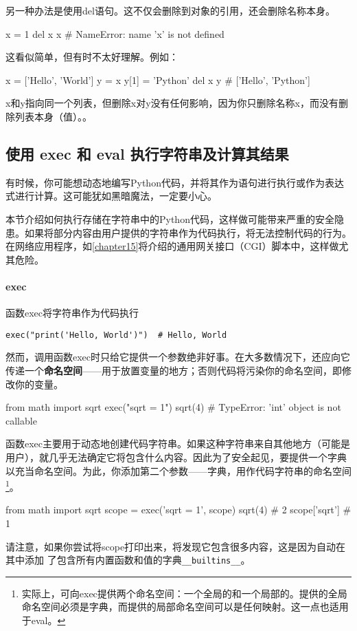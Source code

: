 另一种办法是使用del语句。这不仅会删除到对象的引用，还会删除名称本身。
\begin{pyc}
x = 1
del x
x  # NameError: name 'x' is not defined
\end{pyc}
这看似简单，但有时不太好理解。例如：
\begin{pyc}
x = ['Hello', 'World']
y = x
y[1] = 'Python'
del x
y  # ['Hello', 'Python']
\end{pyc}
x和y指向同一个列表，但删除x对y没有任何影响，因为你只删除名称x，而没有删除列表本身（值）。。
\subsection{使用 exec 和 eval 执行字符串及计算其结果}
有时候，你可能想动态地编写Python代码，并将其作为语句进行执行或作为表达式进行计算。这可能犹如黑暗魔法，一定要小心。
\begin{tcolorbox}[title=警告]
    本节介绍如何执行存储在字符串中的Python代码，这样做可能带来严重的安全隐患。如果将部分内容由用户提供的字符串作为代码执行，将无法控制代码的行为。在网络应用程序，如\autoref{chapter15}将介绍的通用网关接口（CGI）脚本中，这样做尤其危险。
\end{tcolorbox}
\paragraph{exec} 函数exec将字符串作为代码执行

\verb|exec("print('Hello, World')")  # Hello, World|

然而，调用函数exec时只给它提供一个参数绝非好事。在大多数情况下，还应向它传递一个\textbf{命名空间}------用于放置变量的地方；否则代码将污染你的命名空间，即修改你的变量。
\begin{pyc}
from math import sqrt
exec("sqrt = 1")
sqrt(4)  # TypeError: 'int' object is not callable
\end{pyc}
函数exec主要用于动态地创建代码字符串。如果这种字符串来自其他地方（可能是用户），就几乎无法确定它将包含什么内容。因此为了安全起见，要提供一个字典以充当命名空间。为此，你添加第二个参数——字典，用作代码字符串的命名空间\footnote{实际上，可向exec提供两个命名空间：一个全局的和一个局部的。提供的全局命名空间必须是字典，而提供的局部命名空间可以是任何映射。这一点也适用于eval。}。
\begin{pyc}
from math import sqrt
scope = {}
exec('sqrt = 1', scope)
sqrt(4)  # 2
scope['sqrt']  # 1
\end{pyc}
请注意，如果你尝试将scope打印出来，将发现它包含很多内容，这是因为自动在其中添加
了包含所有内置函数和值的字典\verb|__builtins__|。
